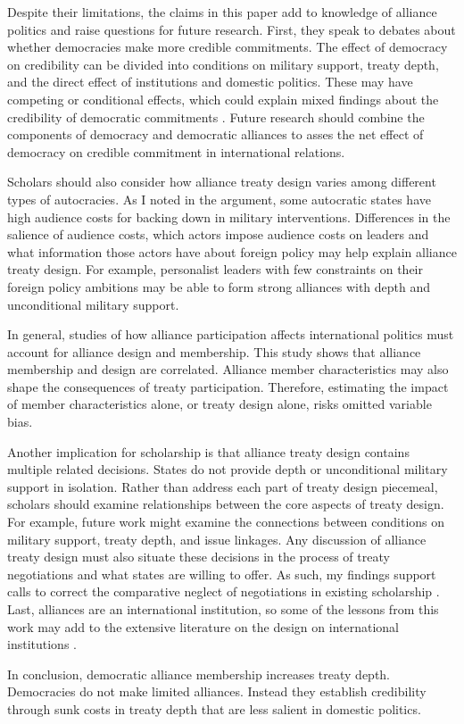 \documentclass[12pt]{article}
\begin{document}
Despite their limitations, the claims in this paper add to knowledge of alliance politics and raise questions for future research. 
First, they speak to debates about whether democracies make more credible commitments. 
The effect of democracy on credibility can be divided into conditions on military support, treaty depth, and the direct effect of institutions and domestic politics. 
These may have competing or conditional effects, which could explain mixed findings about the credibility of democratic commitments \citep{Schultz1999, Leeds1999, Thyne2012, DownesSechser2012}.
Future research should combine the components of democracy and democratic alliances to asses the net effect of democracy on credible commitment in international relations. 


Scholars should also consider how alliance treaty design varies among different types of autocracies. 
As I noted in the argument, some autocratic states have high audience costs for backing down in military interventions. 
Differences in the salience of audience costs, which actors impose audience costs on leaders and what information those actors have about foreign policy \citep{Weeks2008} may help explain alliance treaty design.
For example, personalist leaders with few constraints on their foreign policy ambitions may be able to form strong alliances with depth and unconditional military support. 


In general, studies of how alliance participation affects international politics must account for alliance design and membership. 
This study shows that alliance membership and design are correlated. 
Alliance member characteristics may also shape the consequences of treaty participation.  
Therefore, estimating the impact of member characteristics alone, or treaty design alone, risks omitted variable bias. 


Another implication for scholarship is that alliance treaty design contains multiple related decisions. 
States do not provide depth or unconditional military support in isolation. 
Rather than address each part of treaty design piecemeal, scholars should examine relationships between the core aspects of treaty design. 
For example, future work might examine the connections between conditions on military support, treaty depth, and issue linkages.  
Any discussion of alliance treaty design must also situate these decisions in the process of treaty negotiations and what states are willing to offer.
As such, my findings support calls to correct the comparative neglect of negotiations in existing scholarship \citep{Poast2019a}. 
Last, alliances are an international institution, so some of the lessons from this work may add to the extensive literature on the design on international institutions \citep{DownesRocke1995, MartinSimmons1998, Koremenosetal2001, Koremenos2005, Thompson2010}.


In conclusion, democratic alliance membership increases treaty depth.  
Democracies do not make limited alliances.
Instead they establish credibility through sunk costs in treaty depth that are less salient in domestic politics. 



\singlespace
 
 
\end{document}
